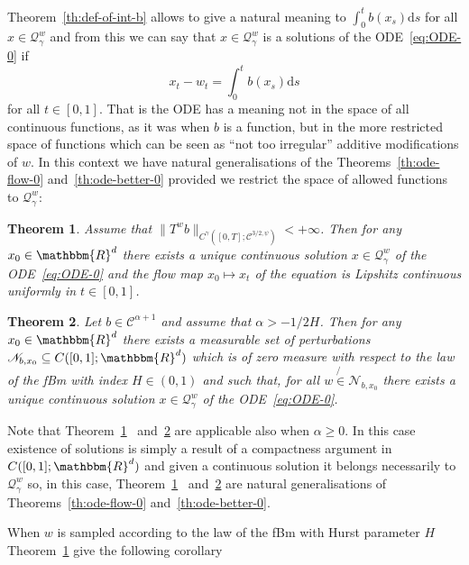 \documentclass[a4paper,11pt]{article}
\newcommand{\mathd}{\mathrm{d}}
\newtheorem{theorem}{Theorem}[section]
\newcommand{\CC}{\mathscr C}
\newcommand{\CQ}{\mathscr Q}
\newcommand{\CN}{\mathscr N}
\begin{document}
Theorem~\ref{th:def-of-int-b} allows to give a natural meaning to
$\int_{0}^{t} b ( x_{s} ) \mathd s$ for all $x \in \CQ^{w}_{\gamma}$
and from this we can say that $x \in \CQ^{w}_{\gamma}$ is a solutions
of the ODE~{\eqref{eq:ODE-0}} if
\[ x_{t} -w_{t} = \int_{0}^{t} b ( x_{s} ) \mathd s \]
for all $t \in [ 0,1 ]$. That is the ODE has a meaning not in the space of all
continuous functions, as it was when $b$ is a function, but in the more
restricted space of functions which can be seen as ``not too irregular''
additive modifications of $w$. In this context we have natural generalisations
of the Theorems~\ref{th:ode-flow-0} and~\ref{th:ode-better-0} provided we
restrict the space of allowed functions to $\CQ^{w}_{\gamma}$:

\begin{theorem}
  \label{th:ode-flow}Assume that $\|T^{w} b\|_{C^{\gamma} ( [ 0,T ] ;
  \CC^{3/2, \psi} )} <+ \infty$. Then for any $x_{0} \in \mathbbm{R}^{d}$
  there exists a unique continuous solution $x \in \CQ^{w}_{\gamma}$
  of the ODE~{\eqref{eq:ODE-0}} and the flow map $x_{0} \mapsto x_{t}$ of the
  equation is Lipshitz continuous uniformly in $t \in [0,1]$.
\end{theorem}

\begin{theorem}
  \label{th:ode-better}Let $b \in \CC^{\alpha +1}$ and assume that $\alpha
  >-1/2H$. Then for any $x_{0} \in \mathbbm{R}^{d}$ there exists a measurable
  set of perturbations $\CN_{b,x_{0}} \subseteq C ( [ 0,1 ]
  ;\mathbbm{R}^{d} )$ which is of zero measure with respect to the law of the
  fBm with index $H \in ( 0,1 )$ and such that, for all $w \not{\in}
  \CN_{b,x_{0}}$ there exists a unique continuous solution $x \in
  \CQ^{w}_{\gamma}$ of the ODE~{\eqref{eq:ODE-0}}.
\end{theorem}

Note that Theorem~\ref{th:ode-flow} \ and~\ref{th:ode-better} are applicable
also when $\alpha \geqslant 0$. In this case existence of solutions is simply
a result of a compactness argument in $C ( [ 0,1 ] ;\mathbbm{R}^{d} )$ and
given a continuous solution it belongs necessarily to
$\CQ^{w}_{\gamma}$ so, in this case, Theorem~\ref{th:ode-flow} \
and~\ref{th:ode-better} are natural generalisations of
Theorems~\ref{th:ode-flow-0} and~\ref{th:ode-better-0}.



When $w$ is sampled according to the law of the fBm with Hurst parameter $H$
Theorem~\ref{th:ode-flow} give the following corollary
\end{document}
